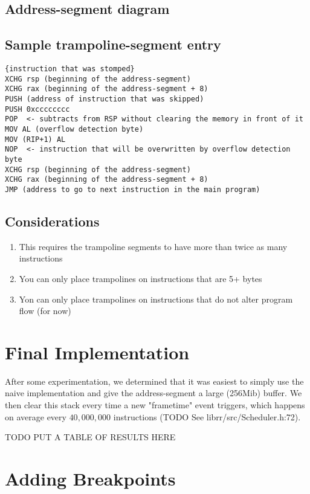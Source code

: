 \subsection{Address-segment diagram}
\begin{drawstack}
  \startframe
   
   \cellcom{}
     
  \startframe
   \cellcom{}
     
   
   \cellcom{}
   \cellcom{}
   \cellcom{}
   
\end{drawstack}


\subsection{Sample trampoline-segment entry}

\begin{verbatim}
{instruction that was stomped}
XCHG rsp (beginning of the address-segment)
XCHG rax (beginning of the address-segment + 8)
PUSH (address of instruction that was skipped)
PUSH 0xcccccccc
POP  <- subtracts from RSP without clearing the memory in front of it 
MOV AL (overflow detection byte) 
MOV (RIP+1) AL
NOP  <- instruction that will be overwritten by overflow detection byte
XCHG rsp (beginning of the address-segment)
XCHG rax (beginning of the address-segment + 8)
JMP (address to go to next instruction in the main program)
\end{verbatim}


\subsection{Considerations}
\begin{enumerate}
    \item This requires the trampoline segments to have more than twice as many instructions
    \item You can only place trampolines on instructions that are 5+ bytes 
    \item Yon can only place trampolines on instructions that do not alter program flow (for now)
\end{enumerate}
\section{Final Implementation}
After some experimentation, we determined that it was easiest to simply use the naive implementation and give the address-segment a large (256Mib) buffer. We then clear this stack every time a new "frametime" event triggers, which happens on average every $40,000,000$ instructions (TODO See librr/src/Scheduler.h:72).

TODO PUT A TABLE OF RESULTS HERE

\section{Adding Breakpoints}
